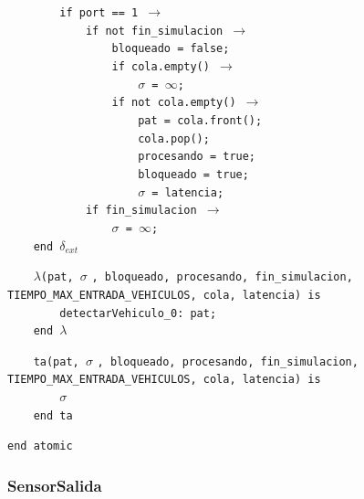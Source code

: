 \documentclass[12pt]{article}
\begin{document}
\begin{tcolorbox}[
    colback=black!5!white,
    colframe=black!80!white,
    boxrule=0.8pt,
    arc=2pt,
    left=5pt,
    right=5pt,
    top=5pt,
    bottom=5pt,
    fontupper=\ttfamily,
    breakable
]
\begin{flushleft}
\texttt{~~~~~~~~if port == 1 }\(\rightarrow\)\\
\texttt{~~~~~~~~~~~~if not fin\_simulacion }\(\rightarrow\)\\
\texttt{~~~~~~~~~~~~~~~~bloqueado = false;}\\
\texttt{~~~~~~~~~~~~~~~~if cola.empty() }\(\rightarrow\)\\
\texttt{~~~~~~~~~~~~~~~~~~~~}$\sigma$\texttt{ = }\(\infty\)\texttt{;}\\
\texttt{~~~~~~~~~~~~~~~~if not cola.empty() }\(\rightarrow\)\\
\texttt{~~~~~~~~~~~~~~~~~~~~pat = cola.front();}\\
\texttt{~~~~~~~~~~~~~~~~~~~~cola.pop();}\\
\texttt{~~~~~~~~~~~~~~~~~~~~procesando = true;}\\
\texttt{~~~~~~~~~~~~~~~~~~~~bloqueado = true;}\\
\texttt{~~~~~~~~~~~~~~~~~~~~}$\sigma$\texttt{ = latencia;}\\
\texttt{~~~~~~~~~~~~if fin\_simulacion }\(\rightarrow\)\\
\texttt{~~~~~~~~~~~~~~~~}$\sigma$\texttt{ = }\(\infty\)\texttt{;}\\
\texttt{~~~~end }$\delta_{ext}$
\end{flushleft}

\begin{flushleft}
\texttt{~~~~}$\lambda$\texttt{(pat, }$\sigma$ \texttt{, bloqueado, procesando, fin\_simulacion, TIEMPO\_MAX\_ENTRADA\_VEHICULOS, cola, latencia) is} \\
\texttt{~~~~~~~~detectarVehiculo\_0: pat;} \\
\texttt{~~~~end }$\lambda$
\end{flushleft}

\begin{flushleft}
\texttt{~~~~ta(pat, }$\sigma$ \texttt{, bloqueado, procesando, fin\_simulacion, TIEMPO\_MAX\_ENTRADA\_VEHICULOS, cola, latencia) is} \\
\texttt{~~~~~~~~}$\sigma$ \\
\texttt{~~~~end ta}
\end{flushleft}

\begin{flushleft}
\texttt{end atomic}
\end{flushleft}
\end{tcolorbox}


\subsubsection{SensorSalida}
\end{document}

